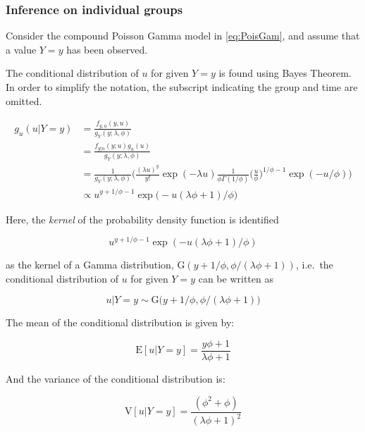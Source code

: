 \documentclass[preprint, 3p,
authoryear]{elsarticle} %
\begin{document}
\hypertarget{inference-on-individual-groups}{%
\subsubsection{Inference on individual
groups}\label{inference-on-individual-groups}}

Consider the compound Poisson Gamma model in \ref{eq:PoisGam}, and
assume that a value \(Y=y\) has been observed.

The conditional distribution of \(u\) for given \(Y=y\) is found using
Bayes Theorem. In order to simplify the notation, the subscript
indicating the group and time are omitted.

\begin{equation}
  \begin{aligned}
    g_{u}(u|Y=y)&=\frac{f_{y,u}(y,u)}{g_Y(y;\lambda, \phi)} \\
    &=\frac{f_{y|u}(y;u)g_{u}(u)}{g_{Y}(y;\lambda,\phi)} \\
    &=\frac{1}{g_{Y}(y;\lambda,\phi)}\Bigg(\frac{(\lambda u)^y}{y!} \exp (-\lambda u) \frac{1}{\phi \Gamma(1/\phi)} \bigg(\frac{u}{\phi}\bigg)^{1/\phi-1} \exp (-u/\phi)\Bigg) \\
    &\propto u^{y+1/\phi-1} \exp \big(- u(\lambda\phi+1)/\phi\big)
  \end{aligned}
\end{equation}

Here, the \textit{kernel} of the probability density function is
identified

\begin{equation}
  u^{y+1/\phi-1} \exp (- u(\lambda\phi+1)/\phi)
\end{equation}

as the kernel of a Gamma distribution,
\(\mathrm{G}(y+1/\phi,\phi/(\lambda\phi+1))\), i.e.~the conditional
distribution of \(u\) for given \(Y=y\) can be written as

\begin{equation}
  u| Y=y\sim \mathrm{G}\big(y+1/\phi,\phi/(\lambda \phi+1)\big)
\end{equation}

The mean of the conditional distribution is given by:

\begin{equation}
  \mathrm{E}[u|Y=y]=\frac{y\phi+1}{\lambda \phi+1}
\end{equation}

And the variance of the conditional distribution is:

\begin{equation}
  \mathrm{V}[u|Y=y]=\frac{( \phi^2+\phi)}{(\lambda \phi + 1)^2}
\end{equation}
\end{document}
